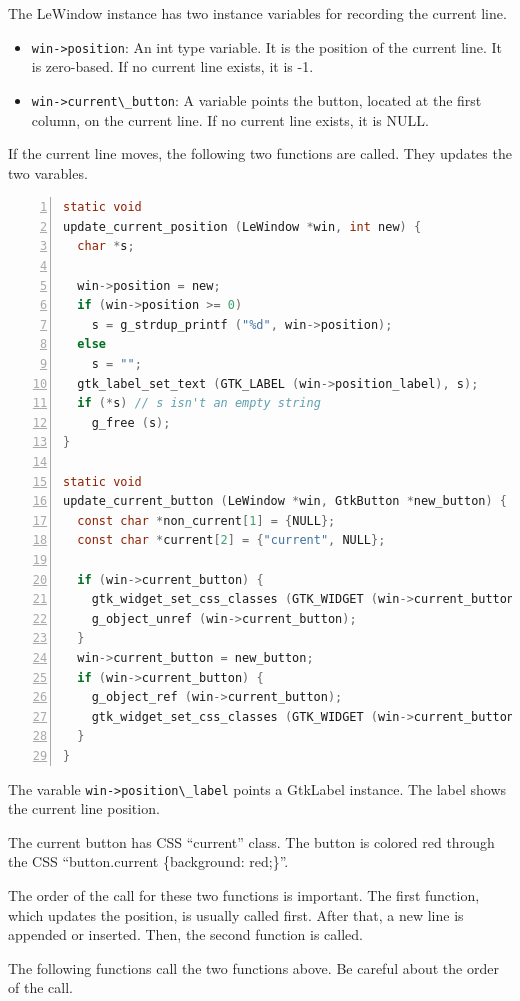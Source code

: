 The LeWindow instance has two instance variables for recording the
current line.

\begin{itemize}
\tightlist
\item
  \passthrough{\lstinline!win->position!}: An int type variable. It is
  the position of the current line. It is zero-based. If no current line
  exists, it is -1.
\item
  \passthrough{\lstinline!win->current\_button!}: A variable points the
  button, located at the first column, on the current line. If no
  current line exists, it is NULL.
\end{itemize}

If the current line moves, the following two functions are called. They
updates the two varables.

\begin{lstlisting}[language=C, numbers=left]
static void
update_current_position (LeWindow *win, int new) {
  char *s;

  win->position = new;
  if (win->position >= 0)
    s = g_strdup_printf ("%d", win->position);
  else
    s = "";
  gtk_label_set_text (GTK_LABEL (win->position_label), s);
  if (*s) // s isn't an empty string
    g_free (s);
}

static void
update_current_button (LeWindow *win, GtkButton *new_button) {
  const char *non_current[1] = {NULL};
  const char *current[2] = {"current", NULL};

  if (win->current_button) {
    gtk_widget_set_css_classes (GTK_WIDGET (win->current_button), non_current);
    g_object_unref (win->current_button);
  }
  win->current_button = new_button;
  if (win->current_button) {
    g_object_ref (win->current_button);
    gtk_widget_set_css_classes (GTK_WIDGET (win->current_button), current);
  }
}
\end{lstlisting}

The varable \passthrough{\lstinline!win->position\_label!} points a
GtkLabel instance. The label shows the current line position.

The current button has CSS ``current'' class. The button is colored red
through the CSS ``button.current \{background: red;\}''.

The order of the call for these two functions is important. The first
function, which updates the position, is usually called first. After
that, a new line is appended or inserted. Then, the second function is
called.

The following functions call the two functions above. Be careful about
the order of the call.

